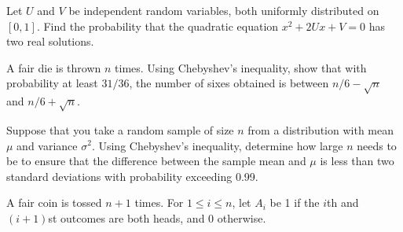 \documentclass[answers]{exam}
\begin{document}
\begin{questions}



\question%
Let $U$ and $V$ be independent random variables, both uniformly distributed on $[0,1]$. Find the probability that the quadratic equation $x^{2}+2 U x+V=0$ has two real solutions.



\question%
A fair die is thrown $n$ times. Using Chebyshev's inequality, show that with probability at least $31 / 36$, the number of sixes obtained is between $n / 6-\sqrt{n}$ and $n / 6+\sqrt{n}$.



\question%
Suppose that you take a random sample of size $n$ from a distribution with mean $\mu$ and variance $\sigma^{2}$. Using Chebyshev's inequality, determine how large $n$ needs to be to ensure that the difference between the sample mean and $\mu$ is less than two standard deviations with probability exceeding 0.99.



\question%
A fair coin is tossed $n+1$ times. For $1 \leq i \leq n$, let $A_{i}$ be 1 if the $i$th and $(i+1)$st outcomes are both heads, and 0 otherwise.
\end{questions}
\end{document}
